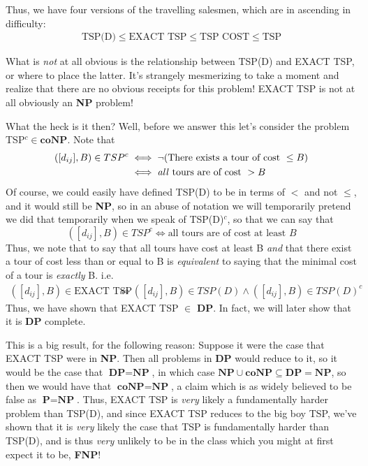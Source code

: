 Thus, we have four versions of the travelling salesmen, which are in ascending in difficulty:
\begin{align}
    \textrm{TSP(D)} \leq \textrm{EXACT TSP} \leq \textrm{TSP COST} \leq \textrm{TSP}
\end{align}
\par What is \textit{not} at all obvious is the relationship between TSP(D) and EXACT TSP, or where to place the latter. It's strangely mesmerizing to take a moment and realize that there are no obvious receipts for this problem! EXACT TSP is not at all obviously an \textbf{NP} problem!
\par What the heck is it then? Well, before we answer this let's consider the problem TSP$^c \in \textbf{coNP}$. Note that
\begin{align}
    ([d_{ij}],B) \in TSP^c &\iff \neg(\textrm{There exists a tour of cost } \leq B) \\
            &\iff \textrm{\textit{all} tours are of cost } > B
\end{align}
Of course, we could easily have defined TSP(D) to be in terms of $<$ and not $\leq$, and it would still be \textbf{NP}, so in an abuse of notation we will temporarily pretend we did that temporarily when we speak of TSP(D)$^c$, so that we can say that 
\[ ([d_{ij}],B) \in TSP^c \iff \textrm{all tours are of cost at least $B$} \]
Thus, we note that to say that all tours have cost at least B \textit{and} that there exist a tour of cost less than or equal to B is \textit{equivalent} to saying that the minimal cost of a tour is \textit{exactly} B. i.e. 
\begin{align}
    ([d_{ij}],B) \in \textrm{EXACT TSP} &\iff ([d_{ij}],B) \in TSP(D) \wedge ([d_{ij}],B) \in TSP(D)^c
\end{align}
Thus, we have shown that EXACT TSP $\in$ \textbf{DP}. In fact, we will later show that it is \textbf{DP} complete.
\par This is a big result, for the following reason: Suppose it were the case that EXACT TSP were in \textbf{NP}. Then all problems in \textbf{DP} would reduce to it, so it would be the case that $\textbf{DP} = \textbf{NP}$, in which case $\textbf{NP} \cup \textbf{coNP} \subseteq \textbf{DP} = \textbf{NP}$, so then we would have that $\textbf{coNP} = \textbf{NP}$, a claim which is as widely believed to be false as $\textbf{P}=\textbf{NP}$. Thus, EXACT TSP is \textit{very} likely a fundamentally harder problem than TSP(D), and since EXACT TSP reduces to the big boy TSP, we've shown that it is \textit{very} likely the case that TSP is fundamentally harder than TSP(D), and is thus \textit{very} unlikely to be in the class which you might at first expect it to be, \textbf{FNP}!
